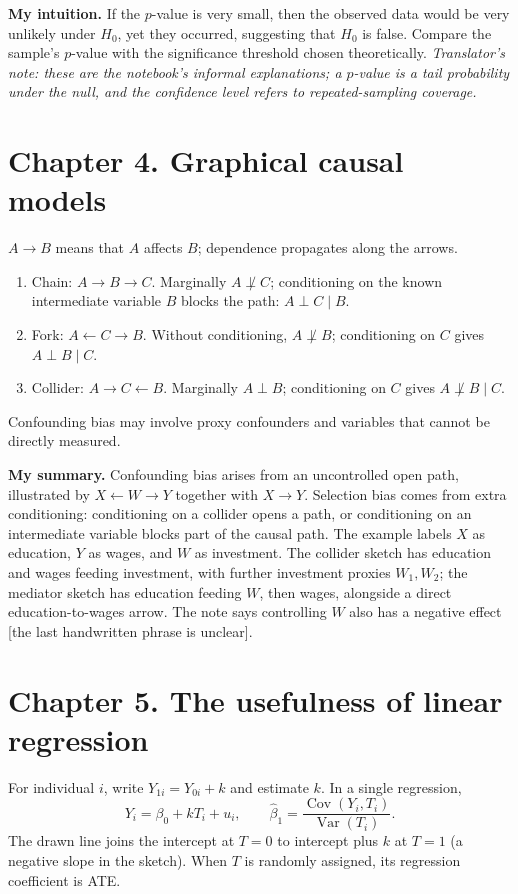 \textbf{My intuition.} If the $p$-value is very small, then the observed data would be very unlikely under $H_0$, yet they occurred, suggesting that $H_0$ is false. Compare the sample's $p$-value with the significance threshold chosen theoretically. \textit{Translator's note: these are the notebook's informal explanations; a $p$-value is a tail probability under the null, and the confidence level refers to repeated-sampling coverage.}

\section{Chapter 4. Graphical causal models}
$A\to B$ means that $A$ affects $B$; dependence propagates along the arrows.
\begin{enumerate}
\item Chain: $A\to B\to C$. Marginally $A\not\perp C$; conditioning on the known intermediate variable $B$ blocks the path: $A\perp C\mid B$.
\item Fork: $A\leftarrow C\to B$. Without conditioning, $A\not\perp B$; conditioning on $C$ gives $A\perp B\mid C$.
\item Collider: $A\to C\leftarrow B$. Marginally $A\perp B$; conditioning on $C$ gives $A\not\perp B\mid C$.
\end{enumerate}
Confounding bias may involve proxy confounders and variables that cannot be directly measured.

\textbf{My summary.} Confounding bias arises from an uncontrolled open path, illustrated by $X\leftarrow W\to Y$ together with $X\to Y$. Selection bias comes from extra conditioning: conditioning on a collider opens a path, or conditioning on an intermediate variable blocks part of the causal path. The example labels $X$ as education, $Y$ as wages, and $W$ as investment. The collider sketch has education and wages feeding investment, with further investment proxies $W_1,W_2$; the mediator sketch has education feeding $W$, then wages, alongside a direct education-to-wages arrow. The note says controlling $W$ also has a negative effect [the last handwritten phrase is unclear].

\section{Chapter 5. The usefulness of linear regression}
For individual $i$, write $Y_{1i}=Y_{0i}+k$ and estimate $k$. In a single regression,
\[Y_i=\beta_0+kT_i+u_i,\qquad \hat\beta_1=\frac{\operatorname{Cov}(Y_i,T_i)}{\operatorname{Var}(T_i)}.\]
The drawn line joins the intercept at $T=0$ to intercept plus $k$ at $T=1$ (a negative slope in the sketch). When $T$ is randomly assigned, its regression coefficient is ATE.

